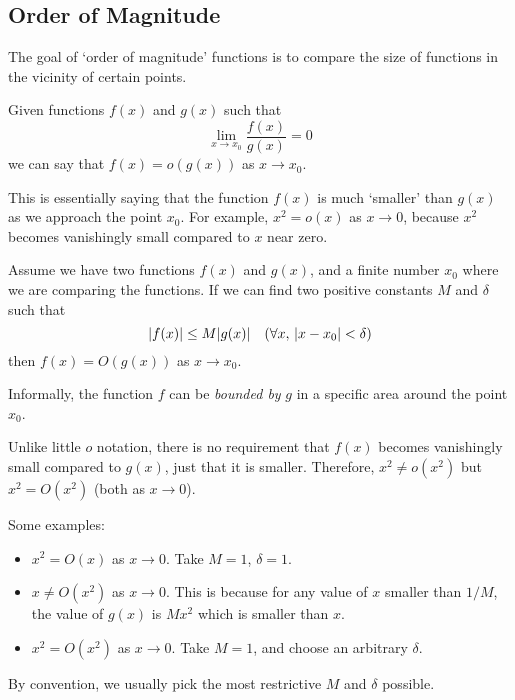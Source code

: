 \documentclass{article}
\begin{document}
\subsection{Order of Magnitude}
The goal of `order of magnitude' functions is to compare the size of functions in the vicinity of certain points.
\begin{definition}[Little $o$]
    Given functions $f(x)$ and $g(x)$ such that
    \begin{equation}
        \lim\limits_{x \to x_0} \frac{f(x)}{g(x)} = 0
    \end{equation}
    we can say that $f(x) = o(g(x))$ as $x \to x_0$.
\end{definition}

This is essentially saying that the function $f(x)$ is much `smaller' than $g(x)$ as we approach the point $x_0$. For example, $x^2 = o(x)$ as $x \to 0$, because $x^2$ becomes vanishingly small compared to $x$ near zero.

\begin{definition}
    Assume we have two functions $f(x)$ and $g(x)$, and a finite number $x_0$ where we are comparing the functions. If we can find two positive constants $M$ and $\delta$ such that
    \begin{equation}
        \abs{f(x)} \leq M\abs{g(x)} \quad(\forall x,\, \abs{x-x_0} < \delta)
    \end{equation}
    then $f(x) = O(g(x))$ as $x \to x_0$.
\end{definition}
Informally, the function $f$ can be \textit{bounded by} $g$ in a specific area around the point $x_0$.

Unlike little $o$ notation, there is no requirement that $f(x)$ becomes vanishingly small compared to $g(x)$, just that it is smaller. Therefore, $x^2 \neq o(x^2)$ but $x^2 = O(x^2)$ (both as $x \to 0$).

Some examples:
\begin{itemize}
    \item $x^2 = O(x)$ as $x \to 0$. Take $M = 1$, $\delta = 1$.
    \item $x \neq O(x^2)$ as $x \to 0$. This is because for any value of $x$ smaller than $1/M$, the value of $g(x)$ is $Mx^2$ which is smaller than $x$.
    \item $x^2 = O(x^2)$ as $x \to 0$. Take $M = 1$, and choose an arbitrary $\delta$.
\end{itemize}

By convention, we usually pick the most restrictive $M$ and $\delta$ possible.
\end{document}
